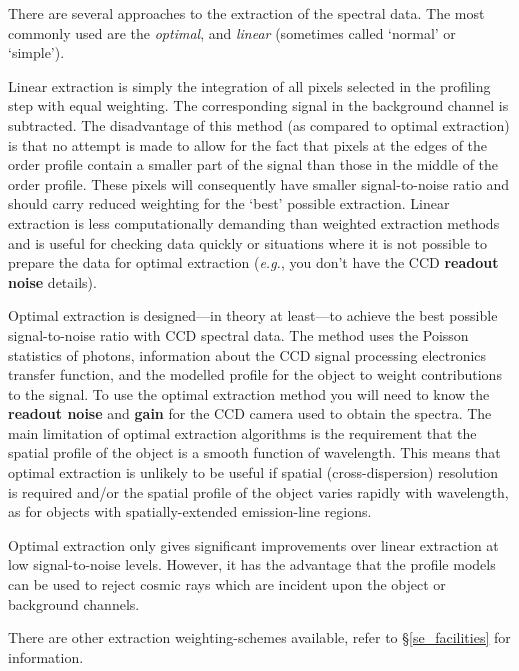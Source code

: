\documentclass[twoside,11pt]{article}
\newcommand{\htmlref}[2]{#1}
\newcommand{\sgspec}[2]{#1}
\newcommand{\sgspec}[2]{#2}
\begin{document}
There are several approaches to the extraction of the spectral data.
The most commonly used are the {\sl optimal}, and {\sl linear} (sometimes
called `normal' or `simple').

Linear extraction is simply the integration of all pixels selected in
the profiling step with equal weighting.  The corresponding signal in
the background channel is subtracted.  The disadvantage of this
method (as compared to optimal extraction) is that no attempt is made to
allow for the fact that pixels at the edges of the order profile contain
a smaller part of the signal than those in the middle of the order
profile.  These pixels will consequently have smaller signal-to-noise
ratio and should carry reduced weighting for the `best' possible
extraction.  Linear extraction is less computationally demanding than
weighted extraction methods and is useful for checking data quickly or
situations where it is not possible to prepare the data for optimal
extraction ({\em{e.g.}}, you don't have the CCD
\htmlref{{\bf readout noise}}{gl_readout_noise} details).

Optimal extraction is designed\sgspec{---}{ - }in theory at
least\sgspec{---}{ - }to achieve the best
possible signal-to-noise ratio with CCD spectral data.  The method uses
the Poisson statistics of photons, information about the CCD signal
processing electronics transfer function, and the modelled profile for
the object to weight contributions to the signal.  To use the optimal
extraction method you will need to know the \htmlref{{\bf readout noise}}
{gl_readout_noise} and \htmlref{{\bf gain}}{gl_ccd_gain} for the CCD
camera used to obtain the spectra.
The main limitation of optimal extraction algorithms is the requirement
that the spatial profile of the object is a smooth function of wavelength.
This means that optimal extraction is unlikely to be useful if spatial
(cross-dispersion) resolution is required and/or the spatial profile
of the object varies rapidly with wavelength, as for objects with
spatially-extended emission-line regions.

Optimal extraction only gives significant improvements over linear
extraction at low signal-to-noise levels.  However, it has the
advantage that the profile models can be used to reject cosmic rays
which are incident upon the object or background channels.

There are other extraction weighting-schemes available, refer to
\sgspec{\S \ref{se_facilities}}
{\htmlref{{\sl Data Reduction Facilities}}{se_facilities}}
for information.
\end{document}

